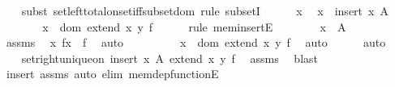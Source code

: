 \begin{isabellebody}
\ \ \isamarkupfalse%
\ {\isacharparenleft}{\kern0pt}subst\ set{\isacharunderscore}{\kern0pt}left{\isacharunderscore}{\kern0pt}total{\isacharunderscore}{\kern0pt}on{\isacharunderscore}{\kern0pt}set{\isacharunderscore}{\kern0pt}iff{\isacharunderscore}{\kern0pt}subset{\isacharunderscore}{\kern0pt}dom{\isacharcomma}{\kern0pt}\ rule\ subsetI{\isacharparenright}{\kern0pt}\isanewline
\ \ \ \ \isamarkupfalse%
\ x{\isacharprime}{\kern0pt}\ \isamarkupfalse%
\ {\isachardoublequoteopen}x{\isacharprime}{\kern0pt}\ {\isasymin}\ insert\ x\ A{\isachardoublequoteclose}\isanewline
\ \ \ \ \isamarkupfalse%
\ \isamarkupfalse%
\ {\isachardoublequoteopen}x{\isacharprime}{\kern0pt}\ {\isasymin}\ dom\ {\isacharparenleft}{\kern0pt}extend\ x\ y\ f{\isacharparenright}{\kern0pt}{\isachardoublequoteclose}\isanewline
\ \ \ \ \isamarkupfalse%
\ {\isacharparenleft}{\kern0pt}rule\ mem{\isacharunderscore}{\kern0pt}insertE{\isacharparenright}{\kern0pt}\isanewline
\ \ \ \ \ \ \isamarkupfalse%
\ {\isachardoublequoteopen}x{\isacharprime}{\kern0pt}\ {\isasymin}\ A{\isachardoublequoteclose}\isanewline
\ \ \ \ \ \ \isamarkupfalse%
\ assms\ \isamarkupfalse%
\ {\isachardoublequoteopen}{\isasymlangle}x{\isacharprime}{\kern0pt}{\isacharcomma}{\kern0pt}\ f{\isacharbackquote}{\kern0pt}x{\isacharprime}{\kern0pt}{\isasymrangle}\ {\isasymin}\ f{\isachardoublequoteclose}\ \isamarkupfalse%
\ auto\isanewline
\ \ \ \ \ \ \isamarkupfalse%
\ \isamarkupfalse%
\ {\isachardoublequoteopen}x{\isacharprime}{\kern0pt}\ {\isasymin}\ dom\ {\isacharparenleft}{\kern0pt}extend\ x\ y\ f{\isacharparenright}{\kern0pt}{\isachardoublequoteclose}\ \isamarkupfalse%
\ auto\isanewline
\ \ \ \ \isamarkupfalse%
\ auto\isanewline
\ \ \isamarkupfalse%
\isanewline
\ \ \isamarkupfalse%
\ {\isachardoublequoteopen}set{\isacharunderscore}{\kern0pt}right{\isacharunderscore}{\kern0pt}unique{\isacharunderscore}{\kern0pt}on\ {\isacharparenleft}{\kern0pt}insert\ x\ A{\isacharparenright}{\kern0pt}\ {\isacharparenleft}{\kern0pt}extend\ x\ y\ f{\isacharparenright}{\kern0pt}{\isachardoublequoteclose}\ \isamarkupfalse%
\ assms\ \isamarkupfalse%
\ blast\isanewline
{}\isamarkupfalse%
\ {\isacharparenleft}{\kern0pt}insert\ assms{\isacharcomma}{\kern0pt}\ auto\ elim{\isacharbang}{\kern0pt}{\isacharcolon}{\kern0pt}\ mem{\isacharunderscore}{\kern0pt}dep{\isacharunderscore}{\kern0pt}functionE{\isacharparenright}{\kern0pt}%

\end{isabellebody}
